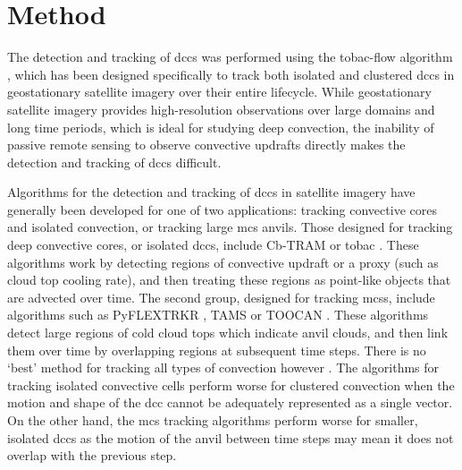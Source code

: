 \section{Method}

The detection and tracking of \acrshort{dcc}s was performed using the tobac-flow algorithm \citep{jones_semi-lagrangian_2023}, which has been designed specifically to track both isolated and clustered \acrshort{dcc}s in geostationary satellite imagery over their entire lifecycle. 
While geostationary satellite imagery provides high-resolution observations over large domains and long time periods, which is ideal for studying deep convection, the inability of passive remote sensing to observe convective updrafts directly makes the detection and tracking of \acrshort{dcc}s difficult.

Algorithms for the detection and tracking of \acrshort{dcc}s in satellite imagery have generally been developed for one of two applications: tracking convective cores and isolated convection, or tracking large \acrshort{mcs} anvils.
Those designed for tracking deep convective cores, or isolated \acrshort{dcc}s, include Cb-TRAM \citep{zinner_cb-tram_2008,zinner_validation_2013} or tobac \citep{heikenfeld_tobac_2019}.
These algorithms work by detecting regions of convective updraft or a proxy (such as cloud top cooling rate), and then treating these regions as point-like objects that are advected over time. 
The second group, designed for tracking \acrshort{mcs}s, include algorithms such as PyFLEXTRKR \citep{feng_pyflextrkr_2022}, TAMS \citep{ocasio_tracking_2020} or TOOCAN \citep{fiolleau_algorithm_2013}. 
These algorithms detect large regions of cold cloud tops which indicate anvil clouds, and then link them over time by overlapping regions at subsequent time steps. 
There is no `best' method for tracking all types of convection however \citep{lakshmanan_objective_2010}. 
The algorithms for tracking isolated convective cells perform worse for clustered convection when the motion and shape of the \acrshort{dcc} cannot be adequately represented as a single vector. 
On the other hand, the \acrshort{mcs} tracking algorithms perform worse for smaller, isolated \acrshort{dcc}s as the motion of the anvil between time steps may mean it does not overlap with the previous step.

